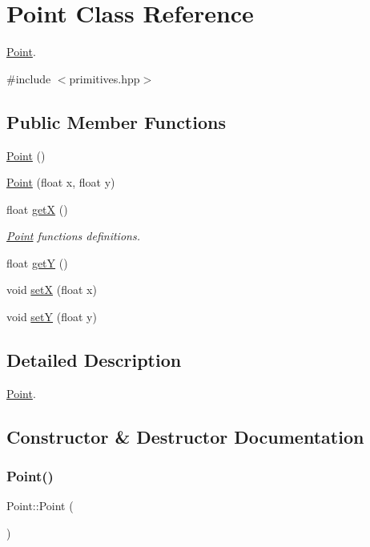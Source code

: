 \hypertarget{classPoint}{}\section{Point Class Reference}
\label{classPoint}


\hyperlink{classPoint}{Point}.  




{\ttfamily \#include $<$primitives.\+hpp$>$}

\subsection*{Public Member Functions}
\begin{DoxyCompactItemize}
\item 
\hyperlink{classPoint_ad92f2337b839a94ce97dcdb439b4325a}{Point} ()
\item 
\hyperlink{classPoint_a30bc8409287de4f43e160664be834636}{Point} (float x, float y)
\item 
float \hyperlink{classPoint_acc27466778cc87a662bba40268c4c0c8}{getX} ()
\begin{DoxyCompactList}\small\item\em \hyperlink{classPoint}{Point} functions definitions. \end{DoxyCompactList}\item 
float \hyperlink{classPoint_a3cccbca94719ddde353cce86ce0e2f64}{getY} ()
\item 
void \hyperlink{classPoint_ac24951f100ad7704f06f59b9cc1956ba}{setX} (float x)
\item 
void \hyperlink{classPoint_a18b8e100ef3ba704ac407cfc7451475c}{setY} (float y)
\end{DoxyCompactItemize}


\subsection{Detailed Description}
\hyperlink{classPoint}{Point}. 

\subsection{Constructor \& Destructor Documentation}
\mbox{\label{classPoint_ad92f2337b839a94ce97dcdb439b4325a}} 
\subsubsection{\texorpdfstring{Point()}{Point()}\hspace{0.1cm}{\footnotesize\ttfamily [1/2]}}
{\footnotesize\ttfamily Point\+::\+Point (\begin{DoxyParamCaption}{ }\end{DoxyParamCaption})}

